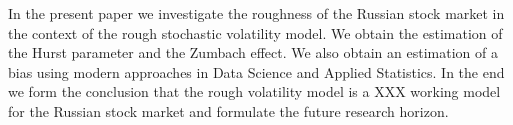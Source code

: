 In the present paper we investigate the roughness of the Russian stock market in the context of the 
rough stochastic volatility model. We obtain the estimation of the Hurst parameter and the 
Zumbach effect. We also obtain an estimation of a bias using modern approaches in Data Science and 
Applied Statistics. In the end we form the conclusion that the rough volatility model is a XXX working
model for the Russian stock market and formulate the future research horizon.